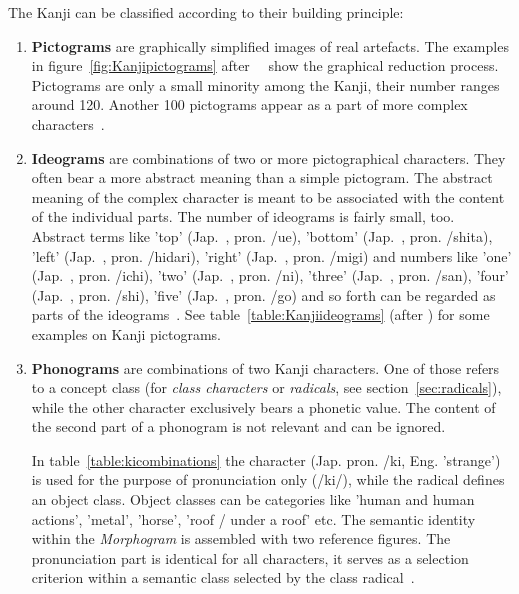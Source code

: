 The Kanji can be classified according to their building principle:
\begin{enumerate}
 \item \textbf{Pictograms} are graphically simplified images of real artefacts.
       The examples in figure~\ref{fig:Kanjipictograms} 
       after~~\citeyear{Kano1990} show the graphical 
       reduction process. Pictograms are only a small minority among the Kanji,
       their number ranges around 120. Another 100 pictograms appear as a part of
       more complex characters~.
       
 \item \textbf{Ideograms} are combinations of two or more pictographical
       characters. They often bear a more abstract meaning than a simple 
       pictogram. The abstract meaning of the complex character is meant to be 
       associated with the content of the individual parts. The number of 
       ideograms is fairly small, too. Abstract terms like 
       'top' (Jap.~, pron. /ue), 
       'bottom' (Jap.~, pron. /shita),
       'left' (Jap.~, pron. /hidari),
       'right' (Jap.~, pron. /migi)
       and numbers like
       'one' (Jap.~, pron. /ichi),
       'two' (Jap.~, pron. /ni),
       'three' (Jap.~, pron. /san),
       'four' (Jap.~, pron. /shi),
       'five' (Jap.~, pron. /go)
       and so forth can be regarded as parts of the 
       ideograms~.
       See table~\ref{table:Kanjiideograms} (after ) for 
       some examples on Kanji pictograms.

 \item \textbf{Phonograms} are combinations of two Kanji characters. One of those
       refers to a concept class (for \emph{class characters} or \emph{radicals},
       see section~\ref{sec:radicals}), 
       while the other character exclusively bears a phonetic value. The content
       of the second part of a phonogram is not relevant and can be ignored.

       In table~\ref{table:kicombinations} the character 
        (Jap. pron. /ki, Eng. 'strange') is used for the purpose
       of pronunciation only (/ki/), while the radical defines an
       object class. Object classes can be categories like 'human and human 
       actions', 'metal', 'horse', 'roof / under a roof' etc.
       The semantic identity within the \emph{Morphogram} is assembled with two
       reference figures. The pronunciation part is identical for all characters,
       it serves as a selection criterion within a semantic class selected by 
       the class radical~.

\end{enumerate}

